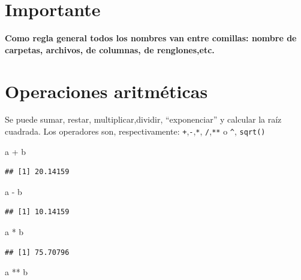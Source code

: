 \documentclass[
]{book}
\newenvironment{Shaded}{\begin{snugshade}}{\end{snugshade}}
\newcommand{\NormalTok}[1]{#1}
\newcommand{\SpecialCharTok}[1]{\textcolor[rgb]{0.00,0.00,0.00}{#1}}
\begin{document}
\hypertarget{importante}{%
\section{Importante}\label{importante}}

\textbf{Como regla general todos los nombres van entre comillas: nombre de carpetas, archivos, de columnas, de renglones,etc.}

\hypertarget{operaciones-aritmuxe9ticas}{%
\section{Operaciones aritméticas}\label{operaciones-aritmuxe9ticas}}

Se puede sumar, restar, multiplicar,dividir, ``exponenciar'' y calcular la raíz cuadrada.
Los operadores son, respectivamente: \texttt{+},\texttt{-},\texttt{*}, \texttt{/},\texttt{**} o \texttt{\^{}}, \texttt{sqrt()}

\begin{Shaded}
\begin{Highlighting}[]
\NormalTok{a }\SpecialCharTok{+}\NormalTok{ b}
\end{Highlighting}
\end{Shaded}

\begin{verbatim}
## [1] 20.14159
\end{verbatim}

\begin{Shaded}
\begin{Highlighting}[]
\NormalTok{a }\SpecialCharTok{{-}}\NormalTok{ b}
\end{Highlighting}
\end{Shaded}

\begin{verbatim}
## [1] 10.14159
\end{verbatim}

\begin{Shaded}
\begin{Highlighting}[]
\NormalTok{a }\SpecialCharTok{*}\NormalTok{ b}
\end{Highlighting}
\end{Shaded}

\begin{verbatim}
## [1] 75.70796
\end{verbatim}

\begin{Shaded}
\begin{Highlighting}[]
\NormalTok{a }\SpecialCharTok{**}\NormalTok{ b}
\end{Highlighting}
\end{Shaded}
\end{document}
